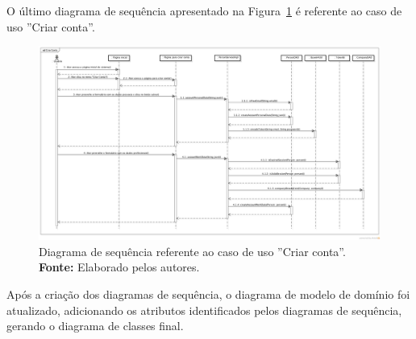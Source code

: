 \begin{landscape}
O último diagrama de sequência apresentado na Figura~\ref{fig:ap1:diagrama_sequencia_criar_conta} é referente ao caso de uso ''Criar conta''.

\newpage
\captionsetup[figure]{list=no}
\begin{figure}[h!]
	\centerline{\includegraphics[scale=0.4]{./imagens/apendices/diagrama-sequencia-criar-conta.png}}
	\caption[Diagrama de sequência referente ao caso de uso ''Criar conta''.]
	{Diagrama de sequência referente ao caso de uso ''Criar conta''. \textbf{Fonte:} Elaborado pelos autores.}
	\label{fig:ap1:diagrama_sequencia_criar_conta}
\end{figure}
\end{landscape}

Após a criação dos diagramas de sequência, o diagrama de modelo de domínio foi atualizado, adicionando os atributos identificados pelos diagramas de sequência, gerando o diagrama de classes final.
